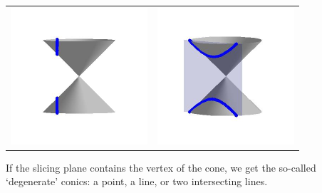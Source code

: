 \documentclass{ximera}
\begin{document}
\begin{center}

\begin{tabular}{cc}

\includegraphics[width=2in]{./IntrotoConicsGraphics/Hyperbola01.jpg} & \includegraphics[width=2in]{./IntrotoConicsGraphics/Hyperbola02.jpg} \\

\end{tabular}

\end{center}


\pagebreak

If the slicing plane contains the vertex of the cone, we get the so-called `degenerate' conics:  a point, a line, or two intersecting lines.  

\label{degenerateconics}
\end{document}
